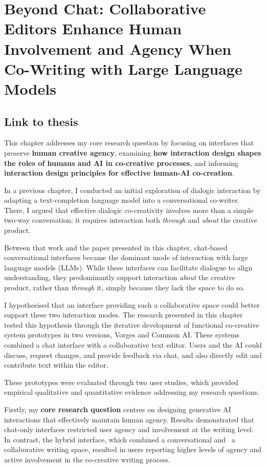 
\chapter{Beyond Chat: Collaborative Editors Enhance Human Involvement and Agency When Co-Writing with Large Language Models} \label{c:tc5} 


\section{Link to thesis}

This chapter addresses my core research question by focusing on interfaces that preserve \textbf{human creative agency}, examining \textbf{how interaction design shapes the roles of humans and AI in co-creative processes}, and informing \textbf{interaction design principles for effective human-AI co-creation}.

In a previous chapter, I conducted an initial exploration of dialogic interaction by adapting a text-completion language model into a conversational co-writer. There, I argued that effective dialogic co-creativity involves more than a simple two-way conversation; it requires interaction both \textit{through} and \textit{about} the creative product.

Between that work and the paper presented in this chapter, chat-based conversational interfaces became the dominant mode of interaction with large language models (LLMs). While these interfaces can facilitate dialogue to align understanding, they predominantly support interaction \textit{about} the creative product, rather than \textit{through} it, simply because they lack the space to do so.

I hypothesised that an interface providing such a collaborative space could better support these two interaction modes. The research presented in this chapter tested this hypothesis through the iterative development of functional co-creative system prototypes in two versions, Vorges and Common AI. These systems combined a chat interface with a collaborative text editor. Users and the AI could discuss, request changes, and provide feedback via chat, and also directly edit and contribute text within the editor.

These prototypes were evaluated through two user studies, which provided empirical qualitative and quantitative evidence addressing my research questions.

Firstly, my \textbf{core research question} centres on designing generative AI interactions that effectively maintain human agency. Results demonstrated that chat-only interfaces restricted user agency and involvement at the writing level. In contrast, the hybrid interface, which combined a conversational and  a collaborative writing space, resulted in users reporting higher levels of agency and active involvement in the co-creative writing process.

